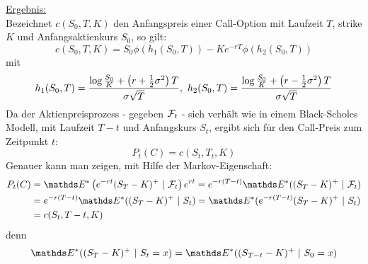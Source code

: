 \uline{Ergebnis:}\\
Bezeichnet $c(S_0,T,K)$ den Anfangspreis einer Call-Option mit Laufzeit $T$, strike $K$ und Anfangsaktienkurs $S_0$, so gilt:
\[
c(S_0,T,K)= S_0\phi(h_1(S_0,T))-Ke^{-rT}\phi(h_2(S_0,T))
\]
mit 
\[
h_1(S_0,T)=\frac{\log\frac{S_0}{K}+\left( r+\frac{1}{2}\sigma^2\right)T}{\sigma\sqrt{T}},~h_2(S_0,T)=\frac{\log\frac{S_0}{K}+\left( r-\frac{1}{2}\sigma^2\right)T}{\sigma\sqrt{T}}
\]
Da der Aktienpreisprozess - gegeben $\mathcal{F}_t$ - sich verhält wie in einem Black-Scholes Modell, mit Laufzeit $T-t$ und Anfangskurs $S_t$, ergibt sich für den Call-Preis zum Zeitpunkt $t$:
\[
P_t(C)=c(S_t,T_t,K)
\]
Genauer kann man zeigen, mit Hilfe der Markov-Eigenschaft:
\begin{equation*}
\begin{aligned}
	P_t(C) &= \E^*\enbrace{e^{-rt}(S_T-K)^+~|~\F_t}e^{rt} = e^{-r(T-t)}\E^*((S_T-K)^+~|~\F_t)\\
	&= e^{-r(T-t)}\E^*((S_T-K)^+~|~S_t) = \E^*(e^{-r(T-t)}(S_T-K)^+~|~S_t)\\
	&= c(S_t,T-t,K)
\end{aligned}
\end{equation*}
denn
\[
\E^*((S_T-K)^+~|~S_t=x) = \E^*((S_{T-t}-K)^+~|~S_0=x)
\]

